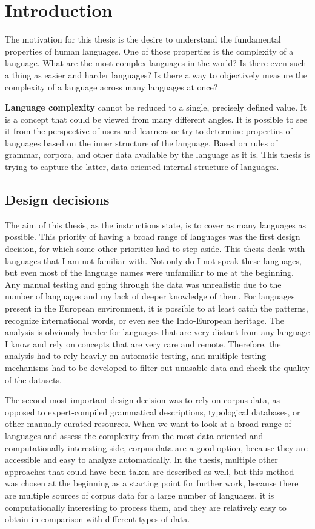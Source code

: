 \chapter{Introduction}

The motivation for this thesis is the desire to understand the fundamental properties of human languages. One of those properties is the complexity of a language. What are the most complex languages in the world? Is there even such a thing as easier and harder languages? Is there a way to objectively measure the complexity of a language across many languages at once?

\textbf{Language complexity} cannot be reduced to a single, precisely defined value. It is a concept that could be viewed from many different angles. It is possible to see it from the perspective of users and learners or try to determine properties of languages based on the inner structure of the language. Based on rules of grammar, corpora, and other data available by the language as it is. This thesis is trying to capture the latter, data oriented internal structure of languages.

\section{Design decisions}

The aim of this thesis, as the instructions state, is to cover as many languages as possible. This priority of having a broad range of languages was the first design decision, for which some other priorities had to step aside. This thesis deals with languages that I am not familiar with. Not only do I not speak these languages, but even most of the language names were unfamiliar to me at the beginning. Any manual testing and going through the data was unrealistic due to the number of languages and my lack of deeper knowledge of them. For languages present in the European environment, it is possible to at least catch the patterns, recognize international words, or even see the Indo-European heritage. The analysis is obviously harder for languages that are very distant from any language I know and rely on concepts that are very rare and remote. Therefore, the analysis had to rely heavily on automatic testing, and multiple testing mechanisms had to be developed to filter out unusable data and check the quality of the datasets.

The second most important design decision was to rely on corpus data, as opposed to expert-compiled grammatical descriptions, typological databases, or other manually curated resources. When we want to look at a broad range of languages and assess the complexity from the most data-oriented and computationally interesting side, corpus data are a good option, because they are accessible and easy to analyze automatically. In the thesis, multiple other approaches that could have been taken are described as well, but this method was chosen at the beginning as a starting point for further work, because there are multiple sources of corpus data for a large number of languages, it is computationally interesting to process them, and they are relatively easy to obtain in comparison with different types of data.

